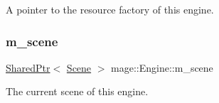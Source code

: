 A pointer to the resource factory of this engine. \hypertarget{classmage_1_1_engine_a82158ab9c1b60538ef8c46d5eb263bb8}{}\label{classmage_1_1_engine_a82158ab9c1b60538ef8c46d5eb263bb8} 
\subsubsection{\texorpdfstring{m\+\_\+scene}{m\_scene}}
{\footnotesize\ttfamily \hyperlink{namespacemage_a1e01ae66713838a7a67d30e44c67703e}{Shared\+Ptr}$<$ \hyperlink{classmage_1_1_scene}{Scene} $>$ mage\+::\+Engine\+::m\+\_\+scene\hspace{0.3cm}{\ttfamily [private]}}

The current scene of this engine. 